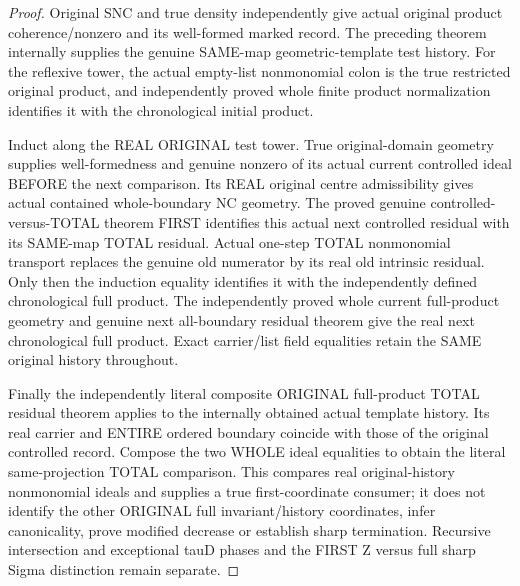 \begin{proof}
Original SNC and true density independently give actual original product
coherence/nonzero and its well-formed marked record. The preceding theorem
internally supplies the genuine SAME-map geometric-template test history.
For the reflexive tower, the actual empty-list nonmonomial colon is the
true restricted original product, and independently proved whole finite
product normalization identifies it with the chronological initial
product.

Induct along the REAL ORIGINAL test tower. True original-domain geometry
supplies well-formedness and genuine nonzero of its actual current
controlled ideal BEFORE the next comparison. Its REAL original centre
admissibility gives actual contained whole-boundary NC geometry. The
proved genuine controlled-versus-TOTAL theorem FIRST identifies this
actual next controlled residual with its SAME-map TOTAL residual. Actual
one-step TOTAL nonmonomial transport replaces the genuine old numerator
by its real old intrinsic residual. Only then the induction equality
identifies it with the independently defined chronological full product.
The independently proved whole current full-product geometry and genuine
next all-boundary residual theorem give the real next chronological full
product. Exact carrier/list field equalities retain the SAME original
history throughout.

Finally the independently literal composite ORIGINAL full-product TOTAL
residual theorem applies to the internally obtained actual template
history. Its real carrier and ENTIRE ordered boundary coincide with those
of the original controlled record. Compose the two WHOLE ideal equalities
to obtain the literal same-projection TOTAL comparison. This compares real
original-history nonmonomial ideals and supplies a true first-coordinate
consumer; it does not identify the other ORIGINAL full invariant/history
coordinates, infer canonicality, prove modified decrease or establish sharp
termination. Recursive intersection and exceptional tauD phases and the
FIRST Z versus full sharp Sigma distinction remain separate.
\end{proof}

